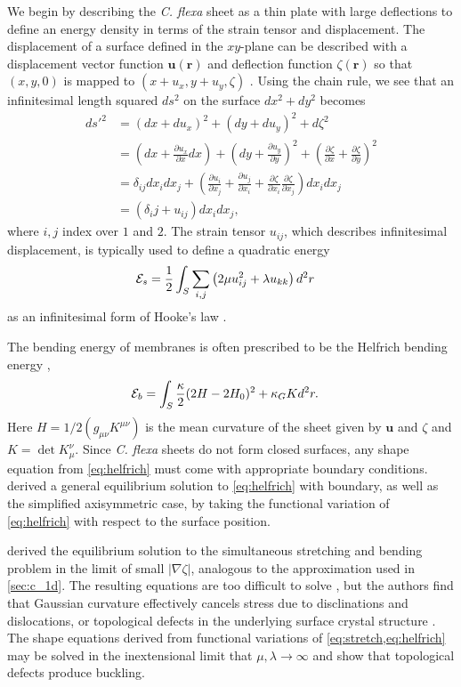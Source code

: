 We begin by describing the \textit{C. flexa} sheet as a thin plate with large deflections to define an energy density in terms of the strain tensor and displacement.
The displacement of a surface defined in the $xy$-plane can be described with a displacement vector function $\bm{u}(\bm{r})$ and deflection function $\zeta(\bm{r})$ so that $(x, y, 0)$ is mapped to $(x + u_x, y + u_y, \zeta)$ \citep{landau1986}.
Using the chain rule, we see that an infinitesimal length squared $ds^2$ on the surface $dx^2 + dy^2$ becomes 
\begin{align*}
	d{s'}^2 &= (dx + du_x)^2 + (dy + du_y)^2 + d\zeta^2 \\
	&= \left(dx + \frac{\partial u_x}{\partial x} dx\right)+ \left(dy + \frac{\partial u_y}{\partial y} \right)^2 + \left(\frac{\partial\zeta}{\partial x} + \frac{\partial\zeta}{\partial y} \right)^2 \\
	&= \delta_{ij} dx_i dx_j + \left(\frac{\partial u_i}{\partial x_j} + \frac{\partial u_j}{\partial x_i} + \frac{\partial \zeta}{\partial x_i} \frac{\partial \zeta}{\partial x_j}\right) dx_i dx_j \\
	&= (\delta_ij + u_{ij}) dx_i dx_j,
\end{align*}
where $i,j$ index over $1$ and $2$. The strain tensor $u_{ij}$, which describes infinitesimal displacement, is typically used to define a quadratic energy 
\begin{align}
	\mathcal{E}_s &= \frac{1}{2} \int_S \sum_{i,j}\left( 2\mu u_{ij}^2 + \lambda u_{kk} \right) d^2r \label{eq:stretch}
\end{align}
as an infinitesimal form of Hooke's law \citep{landau1986}. 

The bending energy of membranes is often prescribed to be the Helfrich bending energy \citep{helfrich1973},
\begin{align}
	\mathcal{E}_b &= \int_S \frac{\kappa}{2} (2H - 2H_0)^2 + \kappa_G K d^2r. \label{eq:helfrich}	
\end{align}
\noindent Here $H=1/2 (g_{\mu\nu}K^{\mu\nu})$ is the mean curvature of the sheet given by $\bm{u}$ and $\zeta$ and $K = \det K_\mu^\nu$. 
Since \textit{C. flexa} sheets do not form closed surfaces, any shape equation from \cref{eq:helfrich} must come with appropriate boundary conditions. 
\citet{tu2003} derived a general equilibrium solution to \cref{eq:helfrich} with boundary, as well as the simplified axisymmetric case, by taking the functional variation of \cref{eq:helfrich} with respect to the surface position.

\citet{seung1988} derived the equilibrium solution to the simultaneous stretching and bending problem in the limit of small $|\nabla \zeta|$, analogous to the approximation used in \cref{sec:c_1d}.
The resulting equations are too difficult to solve \citep{landau1986}, but the authors find that Gaussian curvature effectively cancels stress due to disclinations and dislocations, or topological defects in the underlying surface crystal structure \citep{sachdev1984}.
The shape equations derived from functional variations of \cref{eq:stretch,eq:helfrich} may be solved in the inextensional limit that $\mu,\lambda \to\infty$ and show that topological defects produce buckling.

